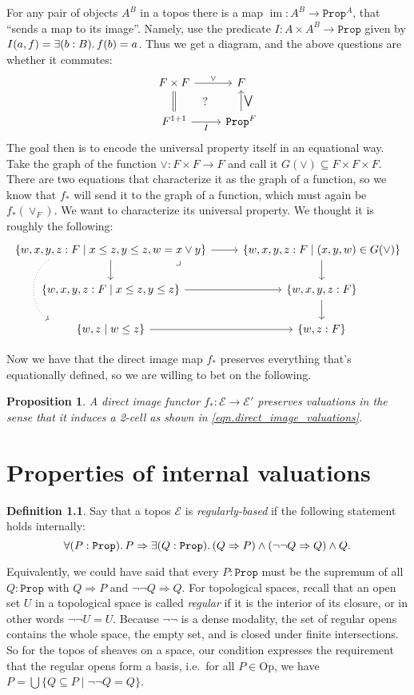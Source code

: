 \documentclass[11pt, oneside, article]{memoir}
\theoremstyle{plain}
\newtheorem{proposition}[theorem]{Proposition}
\theoremstyle{definition}
\newtheorem{definition}[theorem]{Definition}
\theoremstyle{remark}
\renewcommand{\ss}{\subseteq}
\DeclareMathOperator{\im}{im}
\newcommand{\const}[1]{\mathtt{#1}}
\newcommand{\Set}[1]{\mathrm{#1}}
\newcommand{\cat}[1]{\mathcal{#1}}
\newcommand{\Prop}{\const{Prop}}
\newcommand{\Op}{\Set{Op}}
\newcommand{\imp}{\Rightarrow}
\begin{document}
For any pair of objects $A^B$ in a topos there is a map $\im\colon A^B\to\Prop^A$, that ``sends a map to its image''. Namely, use the predicate $I\colon A\times A^B\to\Prop$ given by $I(a,f)=\exists(b:B)\ldotp f(b)=a$. Thus we get a diagram, and the above questions are whether it commutes:
\[
\begin{tikzcd}
	F\times F\ar[d, equal]\ar[r, "\vee"]&F\\
	F^{1+1}\ar[r, "I"']&\Prop^F\ar[u, "\bigvee"']\ar[ul, phantom, "?"]
\end{tikzcd}
\]
The goal then is to encode the universal property itself in an equational way. Take the graph of the function $\vee\colon F\times F\to F$ and call it $G(\vee)\ss F\times F\times F$. There are two equations that characterize it as the graph of a function, so we know that $f_*$ will send it to the graph of a function, which must again be $f_*(\vee_F)$. We want to characterize its universal property. We thought it is roughly the following:
\[
\begin{tikzcd}
	\{w,x,y,z:F\mid x\leq z, y\leq z, w=x\vee y\}\ar[r]\ar[d]\ar[dd, shift right=40pt, bend right=60pt, dotted]
	&\{w,x,y,z:F\mid (x,y,w)\in G(\vee)\}\ar[d]\\
	\{w,x,y,z:F\mid x\leq z, y\leq z\}\ar[r]&\{w,x,y,z:F\}\ar[ul, phantom, very near end, "\lrcorner"]\ar[d]\\
	\{w,z\mid w\leq z\}\ar[r]&\{w,z:F\}
\end{tikzcd}
\]

Now we have that the direct image map $f_*$ preserves everything that's equationally defined, so we are willing to bet on the following.
\begin{proposition}
A direct image functor $f_*\colon\cat{E}\to\cat{E'}$ preserves valuations in the sense that it induces a 2-cell as shown in \cref{eqn.direct_image_valuations}.
\end{proposition}

\newpage
\chapter{Properties of internal valuations}

\begin{definition}
Say that a topos $\cat{E}$ is \emph{regularly-based} if the following statement holds internally:
\[\forall(P:\Prop)\ldotp P\imp\exists(Q:\Prop)\ldotp (Q\imp P)\wedge(\neg\neg Q\imp Q)\wedge Q.\]
\end{definition}

Equivalently, we could have said that every $P:\Prop$ must be the supremum of all $Q:\Prop$ with $Q\imp P$ and $\neg\neg Q\imp Q$. For topological spaces, recall that an open set $U$ in a topological space is called \emph{regular} if it is the interior of its closure, or in other words $\neg\neg U=U$. Because $\neg\neg$ is a dense modality, the set of regular opens contains the whole space, the empty set, and is closed under finite intersections. So for the topos of sheaves on a space, our condition expresses the requirement that the regular opens form a basis, i.e.\ for all $P\in\Op$, we have $P=\bigcup {\{Q\ss P\mid \neg\neg Q=Q\}}$.
\end{document}

